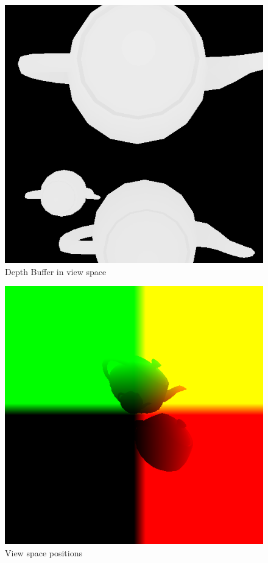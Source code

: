 \begin{center}
	\begin{figure}[here!]
		\includegraphics[width=\textwidth]{src/img/screenshots/depth.png}
		\caption{Depth Buffer in view space}
		\label{img:depth}
	\end{figure}
\end{center}
\begin{center}
	\begin{figure}[here!]
		\includegraphics[width=\textwidth]{src/img/screenshots/view-space.png}		\caption{View space positions}
		\label{img:view-space}
	\end{figure}
\end{center}

